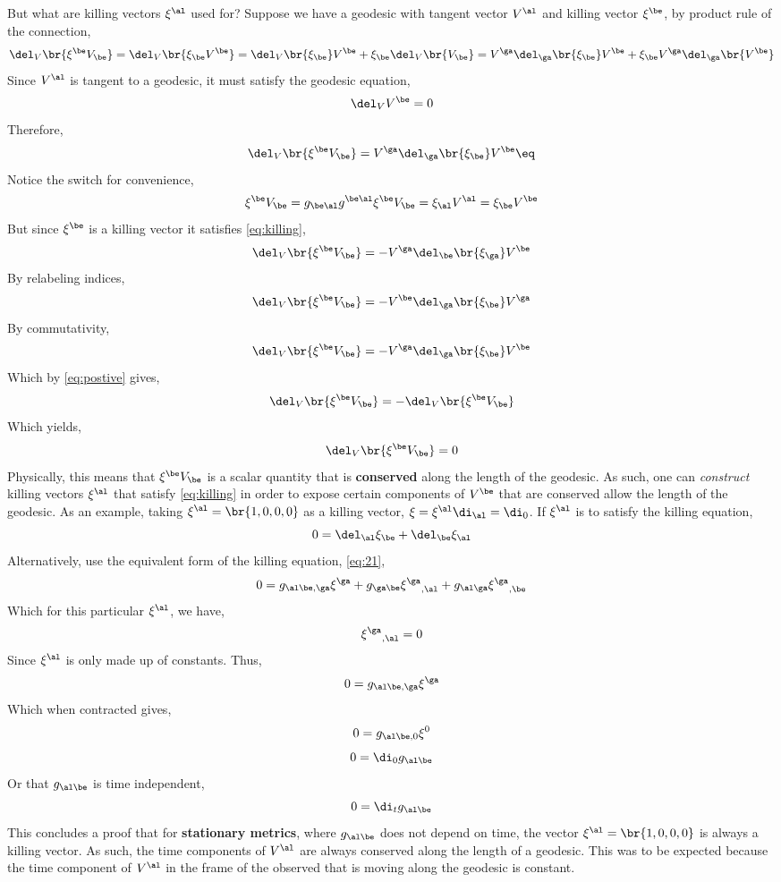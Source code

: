 \documentclass{article}
\begin{document}
But what are killing vectors $\xi^\al$ used for? Suppose we have a geodesic with tangent vector $V^\al$ and killing vector $\xi^\be$, by product rule of the connection,
\[ \del_V \br{\xi^\be V_\be} = \del_V \br{\xi_\be V^\be} = \del_V \br{\xi_\be} V^\be + \xi_\be \del_V \br{V_\be} = V^\ga \del_\ga \br{\xi_\be} V^\be + \xi_\be V^\ga \del_\ga \br{V^\be} \]
Since $V^\al$ is tangent to a geodesic, it must satisfy the geodesic equation,
\[ \del_V V^\be = 0 \]
Therefore,
\[ \del_V \br{\xi^\be V_\be} = V^\ga \del_\ga \br{\xi_\be} V^\be \eq \label{eq:postive}\]
Notice the switch for convenience,
\[ \xi^\be V_\be = g_{\be\al}g^{\be\al} \xi^\be V_\be = \xi_\al V^\al = \xi_\be V^\be \]
But since $\xi^\be$ is a killing vector it satisfies \eqref{eq:killing},
\[ \del_V \br{\xi^\be V_\be} = -V^\ga \del_\be \br{\xi_\ga} V^\be \]
By relabeling indices,
\[ \del_V \br{\xi^\be V_\be} = -V^\be \del_\ga \br{\xi_\be} V^\ga \]
By commutativity,
\[ \del_V \br{\xi^\be V_\be} = - V^\ga\del_\ga \br{\xi_\be} V^\be \]
Which by \eqref{eq:postive} gives,
\[ \del_V \br{\xi^\be V_\be} = - \del_V \br{\xi^\be V_\be} \]
Which yields,
\[ \del_V \br{\xi^\be V_\be} = 0 \]
Physically, this means that $\xi^\be V_\be$ is a scalar quantity that is \textbf{conserved} along the length of the geodesic. As such, one can \textit{construct} killing vectors $\xi^\al$ that satisfy \eqref{eq:killing} in order to expose certain components of $V^\be$ that are conserved allow the length of the geodesic. As an example, taking $\xi^\al = \br{1,0,0,0}$ as a killing vector, $\xi = \xi^\al \di_\al = \di_0$. If $\xi^\al$ is to satisfy the killing equation,
\[ 0 = \del_\al \xi_\be + \del_\be \xi_\al \]
Alternatively, use the equivalent form of the killing equation, \eqref{eq:21},
\[ 0 = g_{\al\be,\ga} \xi^\ga + g_{\ga\be} {\xi^\ga}_{,\al} + g_{\al\ga} {\xi^\ga}_{,\be} \]
Which for this particular $\xi^\al$, we have,
\[ {\xi^\ga}_{,\al} = 0 \]
Since $\xi^\al$ is only made up of constants. Thus,
\[ 0 = g_{\al\be,\ga} \xi^\ga \]
Which when contracted gives,
\[ 0 = g_{\al\be,0} \xi^0 \]
\[ 0 = \di_0 g_{\al\be}\]
Or that $g_{\al\be}$ is time independent,
\[ 0 = \di_t g_{\al\be} \]
This concludes a proof that for \textbf{stationary metrics}, where $g_{\al\be}$ does not depend on time, the vector $\xi^\al = \br{1,0,0,0}$ is always a killing vector. As such, the time components of $V^\al$ are always conserved along the length of a geodesic. This was to be expected because the time component of $V^\al$ in the frame of the observed that is moving along the geodesic is constant.
\end{document}
